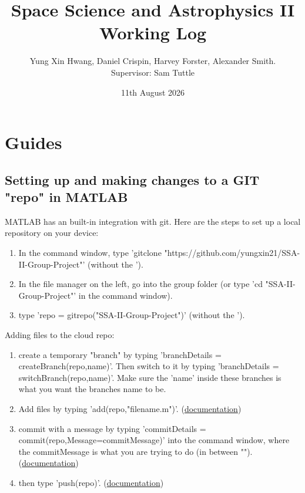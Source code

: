 \documentclass[a4paper]{article}
\title{Space Science and Astrophysics II Working Log}
\author{Yung Xin Hwang, Daniel Crispin, Harvey Forster, Alexander Smith. \\ Supervisor: Sam Tuttle}
\date{11th August 2026}
\begin{document}
\maketitle

\section{Guides}
\subsection{Setting up and making changes to a GIT "repo" in MATLAB}
MATLAB has an built-in integration with git.
Here are the steps to set up a local repository on your device:
\begin{enumerate}
    \item In the command window, type 'gitclone "https://github.com/yungxin21/SSA-II-Group-Project"' (without the ').
    \item In the file manager on the left, go into the group folder (or type 'cd "SSA-II-Group-Project"' in the command window).
    \item type 'repo = gitrepo("SSA-II-Group-Project")' (without the ').
    
\end{enumerate}
Adding files to the cloud repo:
\begin{enumerate}
    \item create a temporary "branch" by typing 'branchDetails = createBranch(repo,name)'. Then switch to it by typing 'branchDetails = switchBranch(repo,name)'. Make sure the 'name' inside these branches is what you want the branches name to be.
    \item Add files by typing 'add(repo,"filename.m")'. (\href{https://au.mathworks.com/help/matlab/ref/matlab.git.gitrepository.add.html#mw_c6df5671-ed7b-45f0-8b1b-a60cf998ae38}{documentation})
    \item commit with a message by typing 'commitDetails = commit(repo,Message=commitMessage)' into the command window, where the commitMessage is what you are trying to do (in between ""). (\href{https://au.mathworks.com/help/matlab/ref/matlab.git.gitrepository.commit.html}{documentation})
    \item then type 'push(repo)'. (\href{https://au.mathworks.com/help/matlab/ref/matlab.git.gitrepository.push.html}{documentation})
\end{enumerate}
\end{document}
